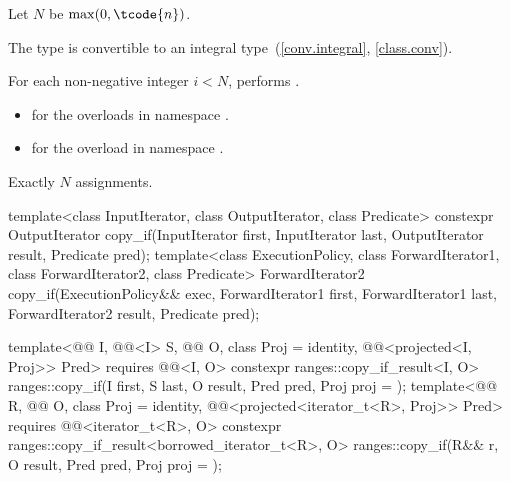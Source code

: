 \begin{itemdescr}
\pnum
Let $N$ be $\max(0, \tcode{n})$.

\pnum
\mandates
The type  is convertible
to an integral type~(\ref{conv.integral}, \ref{class.conv}).

\pnum
\effects
For each non-negative integer $i < N$,
performs .

\pnum
\returns
\begin{itemize}
\item
  for the overloads in namespace .
\item
  for the overload in namespace .
\end{itemize}

\pnum
\complexity
Exactly $N$ assignments.
\end{itemdescr}

%
\begin{itemdecl}
template<class InputIterator, class OutputIterator, class Predicate>
  constexpr OutputIterator copy_if(InputIterator first, InputIterator last,
                                   OutputIterator result, Predicate pred);
template<class ExecutionPolicy, class ForwardIterator1, class ForwardIterator2,
         class Predicate>
  ForwardIterator2 copy_if(ExecutionPolicy&& exec,
                           ForwardIterator1 first, ForwardIterator1 last,
                           ForwardIterator2 result, Predicate pred);

template<@@ I, @@<I> S, @@ O, class Proj = identity,
         @@<projected<I, Proj>> Pred>
  requires @@<I, O>
  constexpr ranges::copy_if_result<I, O>
    ranges::copy_if(I first, S last, O result, Pred pred, Proj proj = {});
template<@@ R, @@ O, class Proj = identity,
         @@<projected<iterator_t<R>, Proj>> Pred>
  requires @@<iterator_t<R>, O>
  constexpr ranges::copy_if_result<borrowed_iterator_t<R>, O>
    ranges::copy_if(R&& r, O result, Pred pred, Proj proj = {});
\end{itemdecl}

